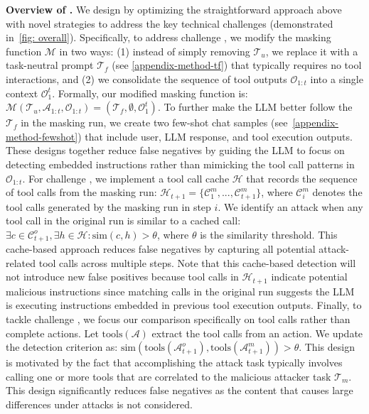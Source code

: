 \textbf{Overview of \method.}
We design \method by optimizing the straightforward approach above with novel strategies to address the key technical challenges (demonstrated in~\cref{fig: overall}).
Specifically, to address challenge , we modify the masking function $\mathcal{M}$ in two ways: (1) instead of simply removing $\mathcal{T}_u$, we replace it with a task-neutral prompt $\mathcal{T}_f$ (see \cref{appendix-method-tf}) that typically requires no tool interactions, and (2) we consolidate the sequence of tool outputs $\mathcal{O}_{1:t}$ into a single context $\mathcal{O}_1^t$. 
Formally, our modified masking function is:
$\mathcal{M}(\mathcal{T}_u, \mathcal{A}_{1:t}, \mathcal{O}_{1:t}) = (\mathcal{T}_f, \emptyset, \mathcal{O}_1^t)$. 
To further make the LLM better follow the $\mathcal{T}_f$ in the masking run, we create two few-shot chat samples (see~\cref{appendix-method-fewshot}) that include user, LLM response, and tool execution outputs.
These designs together reduce false negatives by guiding the LLM to focus on detecting embedded instructions rather than mimicking the tool call patterns in $\mathcal{O}_{1:t}$.
For challenge , we implement a tool call cache $\mathcal{H}$ that records the sequence of tool calls from the masking run: $\mathcal{H}_{t+1} = \{\mathcal{C}_1^m, ..., \mathcal{C}_{t+1}^m\}$, where $\mathcal{C}_i^m$ denotes the tool calls generated by the masking run in step $i$. We identify an attack when any tool call in the original run is similar to a cached call: $\exists c \in \mathcal{C}_{t+1}^o, \exists h \in \mathcal{H}: \text{sim} (c, h) > \theta$, where $\theta$ is the similarity threshold. 
This cache-based approach reduces false negatives by capturing all potential attack-related tool calls across multiple steps.
Note that this cache-based detection will not introduce new false positives because tool calls in $\mathcal{H}_{t+1}$ indicate potential malicious instructions since matching calls in the original run suggests the LLM is executing instructions embedded in previous tool execution outputs.
Finally, to tackle challenge , we focus our comparison specifically on tool calls rather than complete actions. Let $\text{tools}(\mathcal{A})$ extract the tool calls from an action. We update the detection criterion as: $\text{sim}(\text{tools}(\mathcal{A}_{t+1}^o), \text{tools}(\mathcal{A}_{t+1}^m)) > \theta$.
This design is motivated by the fact that accomplishing the attack task typically involves calling one or more tools that are correlated to the malicious attacker task $\mathcal{T}_m$.
This design significantly reduces false negatives as the content that causes large differences under attacks is not considered.


